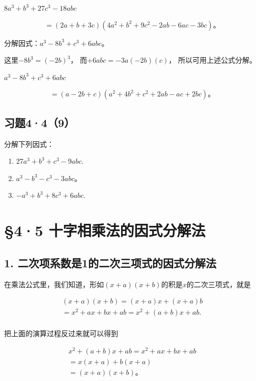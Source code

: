 \(8a^{3} + b^{3} + 27c^{3} - 18abc\)

\[
= (2 a + b + 3 c) (4 a ^{2} + b ^{2} + 9 c ^{2} - 2 a b - 6 a c - 3 b c)\text{。}
\]

 分解因式：\(a^3 - 8b^3 + c^3 + 6abc\)。

 这里\(-8b^{3} = (-2b)^{3}\)，
而\(+6abc = -3a(-2b)(c)\)， 所以可用上述公式分解。

\(a^3 - 8b^3 + c^3 + 6abc\)

\[
= (a - 2 b + c) \left(a ^{2} + 4 b ^{2} + c ^{2} + 2 a b - a c + 2 b c\right)\text{。}
\]

\subsection{习题4·4（9）}

分解下列因式：

\begin{enumerate}[start=1]
\item
  \(27a^{3} + b^{3} + c^{3} - 9abc.\)
\item
  \(a^3 - b^3 - c^3 - 3abc\)。
\item
  \(-a^{3} + b^{3} + 8c^{3} + 6abc.\)
\end{enumerate}

\section{§4·5 十字相乘法的因式分解法}

\subsection{1. 二次项系数是1的二次三项式的因式分解法}

在乘法公式里，我们知道，形如\((x + a)(x + b)\)的积是\(x\)的二次三项式，就是

\[
\begin{array}{l} (x + a) (x + b) = (x + a) x + (x + a) b \\ = x ^{2} + a x + b x + a b = x ^{2} + (a + b) x + a b. \\ \end{array}
\]

把上面的演算过程反过来就可以得到

\[
\begin{array}{l} x ^{2} + (a + b) x + a b = x ^{2} + a x + b x + a b \\ = x (x + a) + b (x + a) \\ = (x + a) (x + b)\text{。} \\ \end{array}
\]


